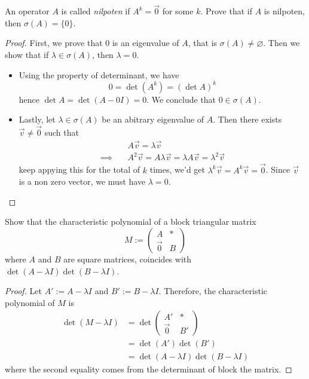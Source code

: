 \documentclass{article}
\begin{document}
\begin{exercise}
  An operator $A$ is called \emph{nilpoten} if $A^k=\vec{0}$ for 
  some $k$. Prove that if $A$ is nilpoten, then 
  $\sigma(A)=\{0\}$.
\end{exercise}
\begin{proof}
  First, we prove that $0$ is an eigenvalue of $A$, that is 
  $\sigma(A)\neq\varnothing$. Then we show that if 
  $\lambda\in\sigma(A)$, then $\lambda=0$.
  \begin{itemize}
    \item Using the property of determinant, we have
      \[0=\det(A^k)=(\det A)^k\]
      hence $\det A=\det(A-0I)=0$. We conclude that 
      $0\in\sigma(A)$.
    \item Lastly, let $\lambda\in\sigma(A)$ be an abitrary eigenvalue
      of $A$. Then there exists $\vec{v}\neq\vec{0}$ such that
      \begin{align*}
        &A\vec{v}=\lambda\vec{v}\\\implies\quad
        &A^2\vec{v}=A\lambda\vec{v}=\lambda A\vec{v}=\lambda^2\vec{v}
      \end{align*}
      keep appying this for the total of $k$ times, we'd get
      $\lambda^k\vec{v}=A^k\vec{v}=\vec{0}$. Since $\vec{v}$ is a non
      zero vector, we must have $\lambda=0$.
  \end{itemize}
\end{proof}
\begin{exercise}
  Show that the characteristic polynomial of a block triangular
  matrix \[M:=\begin{pmatrix} A&*\\ \vec{0}&B \end{pmatrix}\]
  where $A$ and $B$ are square matrices, coincides with 
  $\det(A-\lambda I)\det(B-\lambda I)$.
\end{exercise}
\begin{proof}
  Let $A':=A-\lambda I$ and $B':=B-\lambda I$. Therefore, the 
  characteristic polynomial of $M$ is
  \begin{align*}
    \det(M-\lambda I)
    &=\det \begin{pmatrix} A'&*\\\vec{0}&B' \end{pmatrix}\\
    &=\det(A')\det(B')\\
    &=\det(A-\lambda I)\det(B-\lambda I)
  \end{align*}
  where the second equality comes from the determinant of block 
  the matrix.
\end{proof}
\end{document}
